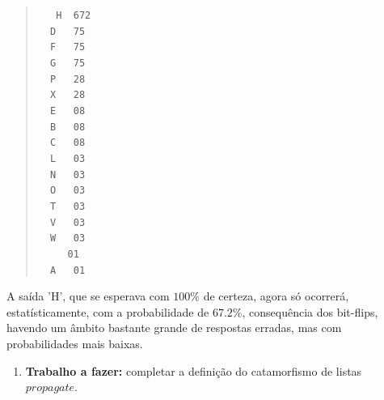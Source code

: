 \documentclass[a4paper]{article}
\newcommand{\Varid}[1]{\mathit{#1}}
\begin{document}
\begin{quote}\small
\begin{tabbing}\tt
~~H~~672\\
\tt ~~D~~~75\\
\tt ~~F~~~75\\
\tt ~~G~~~75\\
\tt ~~P~~~28\\
\tt ~~X~~~28\\
\tt ~~E~~~08\\
\tt ~~B~~~08\\
\tt ~~C~~~08\\
\tt ~~L~~~03\\
\tt ~~N~~~03\\
\tt ~~O~~~03\\
\tt ~~T~~~03\\
\tt ~~V~~~03\\
\tt ~~W~~~03\\
\tt ~~~~~01\\
\tt ~~A~~~01
\end{tabbing}
\end{quote}
A saída 'H', que se esperava com \ensuremath{\mathrm{100}\mathbin{\%}} de certeza,
agora só ocorrerá, estatísticamente, com a probabilidade de \ensuremath{\mathrm{67.2}\mathbin{\%}},
consequência dos bit-flips, havendo um âmbito bastante
grande de respostas erradas, mas com probabilidades mais baixas.

\begin{enumerate}
\item \textbf{Trabalho a fazer:} completar a definição do catamorfismo de listas \ensuremath{\Varid{propagate}}.
\end{enumerate}
\end{document}
